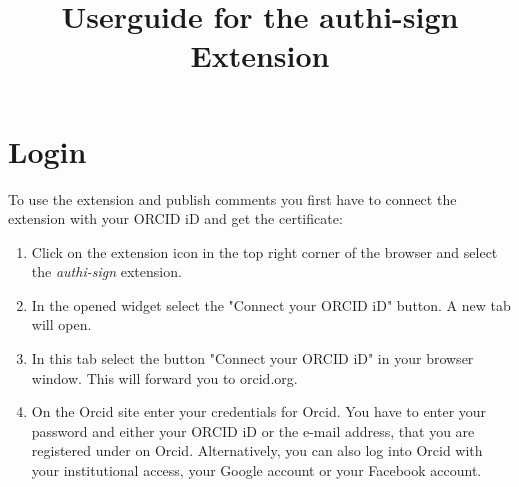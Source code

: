 \documentclass{article}
\title{
    \vspace{-4ex}
    Userguide for the authi-sign Extension
    \vspace{-4ex}
    }
\date{}
\begin{document}
\maketitle

\section{Login}
To use the extension and publish comments you first have to connect the extension with your ORCID iD and get the certificate:

\begin{enumerate}
    \item Click on the extension icon in the top right corner of the browser and select the \textit{authi-sign} extension.
        \begin{figure}[H]
            \centering
        \end{figure}
    \item In the opened widget select the "Connect your ORCID iD" button. A new tab will open.
    \item In this tab select the button "Connect your ORCID iD" in your browser window. This will forward you to orcid.org.
    \item On the Orcid site enter your credentials for Orcid. You have to enter your password and either your ORCID iD or the e-mail address, that you are registered under on Orcid. Alternatively, you can also log into Orcid with your institutional access, your Google account or your Facebook account.
        \begin{figure}[H]
            \centering

\end{figure}
\end{enumerate}
\end{document}
